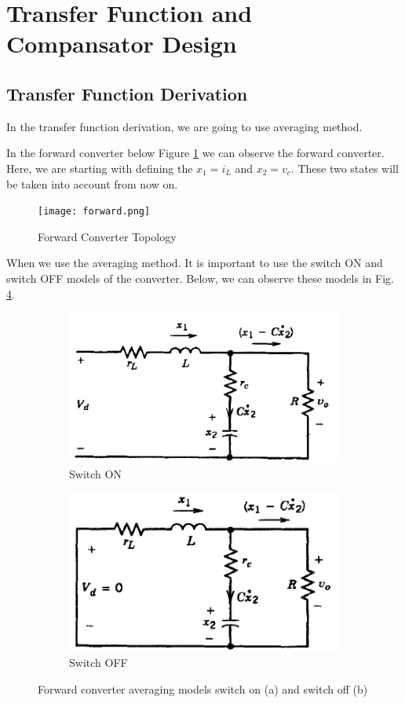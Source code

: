 \section{Transfer Function and Compansator Design}
\subsection{Transfer Function Derivation}

In the transfer function derivation, we are going to use averaging method.

In the forward converter below Figure \ref{forward1} we can observe the forward converter. Here, we are starting with defining the $x_1 = i_L$ and $x_2 = v_c$. These two states will be taken into account from now on.

\begin{center}
\begin{figure}[H]
\centering
\texttt{[image: forward.png]}
\caption{Forward Converter Topology}
\label{forward1}
\end{figure}
\end{center}

When we use the averaging method. It is important to use the switch ON and switch OFF models of the converter. Below, we can observe these models in Fig. \ref{fig:switch}.

\begin{figure}[H]
\centering
\begin{subfigure}{7 cm}
  \centering
  \includegraphics[width=7 cm]{Figs/switchON.PNG}
  \caption{Switch ON}
  \label{fig:input_current_48}
\end{subfigure}%
\begin{subfigure}{7 cm}
  \centering
  \includegraphics[width=7 cm]{Figs/switchOFF.PNG}
  \caption{Switch OFF}
  \label{fig:inductor_current_48}
\end{subfigure}
\caption{Forward converter averaging models switch on (a) and switch off (b)}
\label{fig:switch}
\end{figure}

